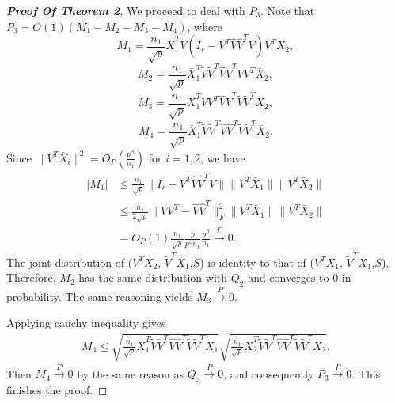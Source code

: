 \begin{proof}[\textbf{Proof Of Theorem 2}]
We proceed to deal with $P_3$. Note that $P_3=O(1)(M_1-M_2-M_3-M_4)$, where
    \begin{equation*}
        M_1=\frac{n_1}{\sqrt{p}}\bar{X}_1^T V(I_r-V^T\hat{V}\hat{V}^T V)V^T \bar{X}_2,
    \end{equation*}
    \begin{equation*}
        M_2=\frac{n_1}{\sqrt{p}}\bar{X}_1^T \tilde{V}\tilde{V}^T\hat{V}\hat{V}^T VV^T \bar{X}_2,
    \end{equation*}
    \begin{equation*}
        M_3=\frac{n_1}{\sqrt{p}}\bar{X}_1^T {V}{V}^T\hat{V}\hat{V}^T \tilde{V}\tilde{V}^T \bar{X}_2,
    \end{equation*}
    \begin{equation*}
        M_4=\frac{n_1}{\sqrt{p}}\bar{X}_1^T \tilde{V}\tilde{V}^T\hat{V}\hat{V}^T \tilde{V}\tilde{V}^T \bar{X}_2.
    \end{equation*}
Since $\|V^T\bar{X}_i\|^2=O_P(\frac{p^{\beta}}{n_1})$ for $i=1,2$, we have
    \begin{equation}\label{myM1}
        \begin{aligned}
            |M_1|&\leq \frac{n_1}{\sqrt{p}}\|I_r-V^T \hat{V}\hat{V}^T V\| \|V^T\bar{X}_1\|\|V^T\bar{X}_2\|\\
            &\leq \frac{n_1}{2\sqrt{p}}\|VV^T -\hat{V}\hat{V}^T\|^2_F \|V^T\bar{X}_1\|\|V^T\bar{X}_2\|\\
            &=O_P(1)\frac{n_1}{\sqrt{p}}\frac{p}{p^{\beta}n_1}\frac{p^\beta}{n_1}\xrightarrow{P}0.
        \end{aligned}
    \end{equation}
The joint distribution of ($V^T\bar{X}_2$, $\tilde{V}^T\bar{X}_1$,$S$) is identity to that of ($V^T\bar{X}_1$, $\tilde{V}^T\bar{X}_1$,$S$). Therefore, $M_2$ has the same distribution with $Q_2$ and converges to $0$ in probability. The same reasoning yields $M_3\xrightarrow{P}0$.

    Applying cauchy inequality gives
    \begin{equation*}
        \begin{aligned}
            M_4\leq \sqrt{\frac{n_1}{\sqrt{p}}\bar{X}_1^T\tilde{V}\tilde{V}^T \hat{V}\hat{V}^T \tilde{V}\tilde{V}^T\bar{X}_1}
            \sqrt{\frac{n_1}{\sqrt{p}}\bar{X}_2^T\tilde{V}\tilde{V}^T \hat{V}\hat{V}^T \tilde{V}\tilde{V}^T\bar{X}_2}.
        \end{aligned}
    \end{equation*}
    Then $M_4\xrightarrow{P} 0$ by the same reason as $Q_3\xrightarrow{P} 0$, and consequently $P_3\xrightarrow{P}0$. This finishes the proof.

\end{proof}

